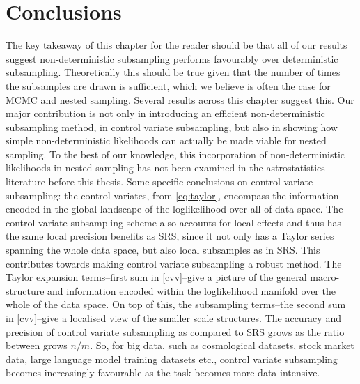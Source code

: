\section{Conclusions}


The key takeaway of this chapter for the reader should be that all of our results suggest non-deterministic subsampling performs favourably over deterministic subsampling. Theoretically this should be true given that the number of times the subsamples are drawn is sufficient, which we believe is often the case for MCMC and nested sampling. Several results across this chapter suggest this. Our major contribution is not only in introducing an efficient non-deterministic subsampling method, in control variate subsampling, but also in showing how simple non-deterministic likelihoods can actually be made viable for nested sampling. To the best of our knowledge, this incorporation of non-deterministic likelihoods in nested sampling has not been examined in the astrostatistics literature before this thesis.
Some specific conclusions on control variate subsampling: the control variates, from \cref{eq:taylor}, encompass the information encoded in the global landscape of the loglikelihood over all of data-space. The control variate subsampling scheme also accounts for local effects and thus has the same local precision benefits as SRS, since it not only has a Taylor series spanning the whole data space, but also local subsamples as in SRS. This contributes towards making control variate subsampling a robust method. The Taylor expansion terms--first sum in \cref{cvv}--give a picture of the general macro-structure and information encoded within the loglikelihood manifold over the whole of the data space. On top of this, the subsampling terms--the second sum in \cref{cvv}--give a localised view of the smaller scale structures. The accuracy and precision of control variate subsampling as compared to SRS grows as the ratio between grows $n/m$. So, for big data, such as cosmological datasets, stock market data, large language model training datasets etc., control variate subsampling becomes increasingly favourable as the task becomes more data-intensive.

